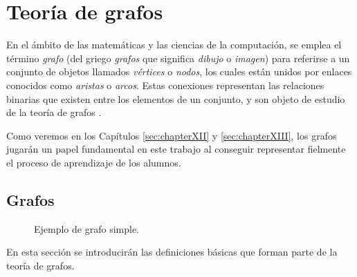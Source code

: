 \chapter{Teoría de grafos}\label{sec:chapterV}

En el ámbito de las matemáticas y las ciencias de la computación, se emplea el término \emph{grafo} (del griego \emph{grafos} que significa \emph{dibujo} o \emph{imagen}) para referirse a un conjunto de objetos llamados \emph{vértices} o \emph{nodos}, los cuales están unidos por enlaces conocidos como \emph{aristas} o \emph{arcos}. Estas conexiones representan las relaciones binarias que existen entre los elementos de un conjunto, y son objeto de estudio de la teoría de grafos \cite{IJSRCSEIT:graph_theory_applications}.

Como veremos en los Capítulos \ref{sec:chapterXII} y \ref{sec:chapterXIII}, los grafos jugarán un papel fundamental en este trabajo al conseguir representar fielmente el proceso de aprendizaje de los alumnos.

\section{Grafos}

\begin{wrapfigure}{r}{0.4\textwidth}
\centering
{}
\caption{Ejemplo de grafo simple.}
\label{fig:grafo1}
\end{wrapfigure}

En esta sección se introducirán las definiciones básicas que forman parte de la teoría de grafos.

